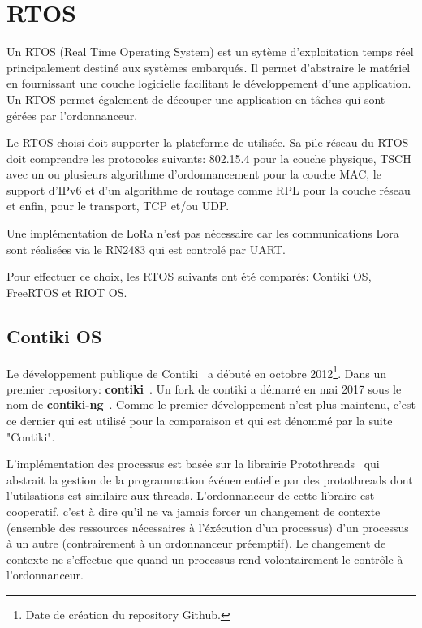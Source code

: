 \section{RTOS}

Un RTOS (Real Time Operating System) est un sytème d'exploitation temps réel principalement destiné aux systèmes embarqués. Il permet d'abstraire le matériel en fournissant une couche logicielle facilitant le développement d'une application. Un RTOS permet également de découper une application en tâches qui sont gérées par l'ordonnanceur.

%

Le RTOS choisi doit supporter la plateforme de utilisée. Sa pile réseau du RTOS doit comprendre les protocoles suivants: 802.15.4 pour la couche physique, TSCH avec un ou plusieurs algorithme d'ordonnancement pour la couche MAC, le support d'IPv6 et d'un algorithme de routage comme RPL pour la couche réseau et enfin, pour le transport, TCP et/ou UDP.

Une implémentation de LoRa n'est pas nécessaire car les communications Lora sont réalisées via le 
RN2483 qui est controlé par UART.

Pour effectuer ce choix, les RTOS suivants ont été comparés: Contiki OS, FreeRTOS et RIOT OS.

\subsection*{Contiki OS}\label{subsec:etat_art:rtos:contiki}
    Le développement publique de Contiki~\cite{paper:contiki} a débuté en octobre 2012\footnote{Date de création du repository Github.}. Dans un premier repository: \textbf{contiki}~\cite{contiki-repo:old}. Un fork de contiki a démarré en mai 2017 sous le nom de \textbf{contiki-ng}~\cite{contiki-repo:ng}. Comme le premier développement n'est plus maintenu, c'est ce dernier qui est utilisé pour la comparaison et qui est dénommé par la suite "Contiki".

    L'implémentation des processus est basée sur la librairie Protothreads~\cite{paper:protothreads}
    qui abstrait la gestion de la programmation événementielle par des protothreads dont l'utilsations est similaire aux threads. L'ordonnanceur de cette libraire est cooperatif, c'est à dire qu'il ne va jamais forcer un changement de contexte (ensemble des ressources nécessaires à l'éxécution d'un processus) d'un processus à un autre (contrairement à un ordonnanceur préemptif). Le changement de contexte ne s'effectue que quand un processus rend volontairement le contrôle à l'ordonnanceur.

